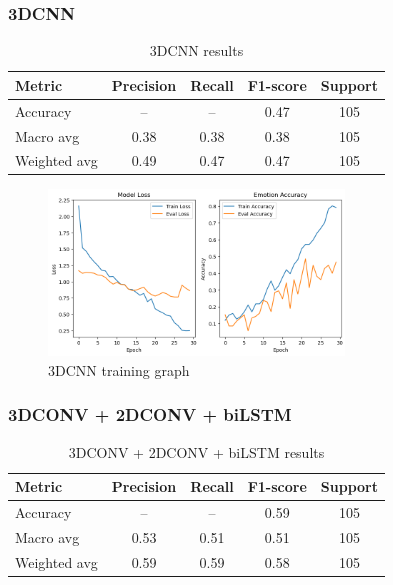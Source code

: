 \documentclass{article}
\begin{document}
\subsubsection{3DCNN}

\begin{table}[H]
\centering
\caption{3DCNN results}
\begin{tabular}{|l|c|c|c|c|}
\hline
\textbf{Metric} & \textbf{Precision} & \textbf{Recall} & \textbf{F1-score} & \textbf{Support} \\
\hline
Accuracy       & --   & --   & 0.47 & 105 \\
Macro avg      & 0.38 & 0.38 & 0.38 & 105 \\
Weighted avg   & 0.49 & 0.47 & 0.47 & 105 \\
\hline
\end{tabular}%
\label{tab:table1}
\end{table}

\begin{figure}[H]
  \begin{center}
    \includegraphics*[width=0.7\textwidth]{Figures/Picture5.png}
  \end{center}
  \caption{3DCNN training graph}
  \label{fig:fig5}
\end{figure}

\subsubsection{3DCONV + 2DCONV + biLSTM}

\begin{table}[H]
\centering
\caption{3DCONV + 2DCONV + biLSTM results}
\begin{tabular}{|l|c|c|c|c|}
\hline
\textbf{Metric} & \textbf{Precision} & \textbf{Recall} & \textbf{F1-score} & \textbf{Support} \\
\hline
Accuracy       & --   & --   & 0.59 & 105 \\
Macro avg      & 0.53 & 0.51 & 0.51 & 105 \\
Weighted avg   & 0.59 & 0.59 & 0.58 & 105 \\
\hline
\end{tabular}%
\label{tab:table2}
\end{table}
\end{document}

